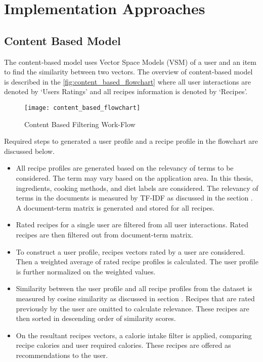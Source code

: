 \section{Implementation Approaches}
\label{sec:impl_approaches}
\subsection{Content Based Model}
\label{sec:cb}

The content-based model uses Vector Space Models (VSM) of a user and an item to find the similarity between two vectors. The overview of content-based model is described in the \autoref{fig:content_based_flowchart} where all user interactions are denoted by \lq{}Users Ratings\rq{} and all recipes information is denoted by \lq{}Recipes\rq{}.
\begin{singlespace}
\begin{figure}[H]
	\centering
	\texttt{[image: content\_based\_flowchart]}
	\caption{Content Based Filtering Work-Flow }
	\label{fig:content_based_flowchart}
\end{figure}  
\end{singlespace}

\noindent
Required steps to generated a user profile and a recipe profile in the flowchart are discussed below.
\begin{itemize}
\item All recipe profiles are generated based on the relevancy of terms to be considered. The term may vary based on the application area. In this thesis, ingredients, cooking methods, and diet labels are considered. The relevancy of terms in the documents is measured by TF-IDF as discussed in the section . A document-term matrix is generated and stored for all recipes. 
\item Rated recipes for a single user are filtered from all user interactions. Rated recipes are then filtered out from document-term matrix. 
\item To construct a user profile, recipes vectors rated by a user are considered. Then a weighted average of rated recipe profiles is calculated. The user profile is further normalized on the weighted values. 
\item Similarity between the user profile and all recipe profiles from the dataset is measured by cosine similarity as discussed in section . Recipes that are rated previously by the user are omitted to calculate relevance. These recipes are then sorted in descending order of similarity scores.
\item On the resultant recipes vectors, a calorie intake filter is applied, comparing recipe calories and user required calories. These recipes are offered as recommendations to the user.  
\end{itemize}
 
